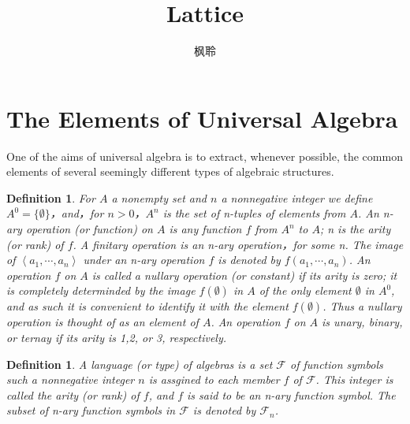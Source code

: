 \documentclass{article}
\newtheorem{definition}[theorem]{Definition}
\begin{document}
\title{Lattice}
\author{枫聆}
\maketitle
\tableofcontents
\newpage
\section{The Elements of Universal Algebra}

{\color{red}
One of the aims of universal algebra is to extract, whenever possible, the common elements
of several seemingly different types of algebraic structures}.

\begin{definition}
\rm For $A$ a nonempty set and $n$ a nonnegative integer we define $A^{0} = \{\emptyset\}$，and，for $n > 0$，$A^n$ is the set of n-tuples of elements from $A$. An {\color{red} n-ary operation} (or function) on $A$ is any function $f$ from $A^n$ to $A$; n is the {\color{red} arity} (or rank) of $f$. A {\color{red} finitary operation} is an n-ary operation，for some n. The image of $\left< a_1, \cdots , a_n \right>$ under an n-ary operation $f$ is denoted by $f(a_1,\cdots,a_n)$. An operation $f$ on $A$ is called a {\color{red} nullary operation} (or constant) if its arity is zero; it is completely determinded by the image $f(\emptyset)$ in $A$ of the only element $\emptyset$ in $A^0$, and as such it is convenient to identify it with the element $f(\emptyset)$. Thus a nullary operation is thought of as an element of $A$. An operation $f$ on $A$ is {\color{red} unary, binary, or ternay} if its arity is 1,2, or 3, respectively.
\end{definition}


\begin{definition}
\rm A {\color{red} language} (or type) of algebras is a set $\mathcal{F}$ of function symbols such a nonnegative integer $n$ is assgined to each member $f$ of $\mathcal{F}$. This integer is called the arity (or rank) of $f$, and $f$ is said to be an n-ary function symbol. The subset of n-ary function symbols in $\mathcal{F}$ is denoted by $\mathcal{F}_n$.
\end{definition}
\end{document}
